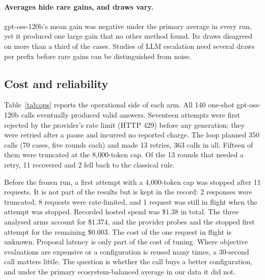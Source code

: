\paragraph{Averages hide rare gains, and draws vary.} gpt-oss-120b's mean gain was negative under the primary average in every run, yet it produced one large gain that no other method found. Its draws disagreed on more than a third of the cases. Studies of LLM escalation need several draws per prefix before rare gains can be distinguished from noise.

\subsection{Cost and reliability}

Table~\ref{tab:ops} reports the operational side of each arm. All 140 one-shot gpt-oss-120b calls eventually produced valid answers. Seventeen attempts were first rejected by the provider's rate limit (HTTP 429) before any generation; they were retried after a pause and incurred no reported charge. The loop planned 350 calls (70 cases, five rounds each) and made 13 retries, 363 calls in all. Fifteen of them were truncated at the 8,000-token cap. Of the 13 rounds that needed a retry, 11 recovered and 2 fell back to the classical rule.

Before the frozen run, a first attempt with a 4,000-token cap was stopped after 11 requests. It is not part of the results but is kept in the record: 2 responses were truncated, 8 requests were rate-limited, and 1 request was still in flight when the attempt was stopped. Recorded hosted spend was \$1.38 in total. The three analysed arms account for \$1.374, and the provider probes and the stopped first attempt for the remaining \$0.003. The cost of the one request in flight is unknown.
Proposal latency is only part of the cost of tuning. Where objective evaluations are expensive or a configuration is reused many times, a 30-second call matters little. The question is whether the call buys a better configuration, and under the primary ecosystem-balanced average in our data it did not.

